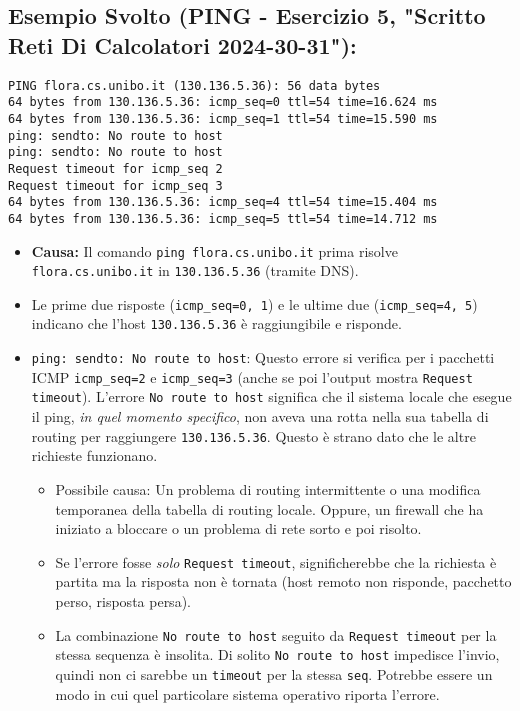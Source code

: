 \subsection{Esempio Svolto (PING - Esercizio 5, "Scritto Reti Di Calcolatori 2024-30-31"):}
\begin{verbatim}
PING flora.cs.unibo.it (130.136.5.36): 56 data bytes
64 bytes from 130.136.5.36: icmp_seq=0 ttl=54 time=16.624 ms
64 bytes from 130.136.5.36: icmp_seq=1 ttl=54 time=15.590 ms
ping: sendto: No route to host
ping: sendto: No route to host
Request timeout for icmp_seq 2
Request timeout for icmp_seq 3
64 bytes from 130.136.5.36: icmp_seq=4 ttl=54 time=15.404 ms
64 bytes from 130.136.5.36: icmp_seq=5 ttl=54 time=14.712 ms
\end{verbatim}
\begin{itemize}
    \item \textbf{Causa:} Il comando \texttt{ping flora.cs.unibo.it} prima risolve \texttt{flora.cs.unibo.it} in \texttt{130.136.5.36} (tramite DNS).
    \item Le prime due risposte (\texttt{icmp\_seq=0, 1}) e le ultime due (\texttt{icmp\_seq=4, 5}) indicano che l'host \texttt{130.136.5.36} è raggiungibile e risponde.
    \item \texttt{ping: sendto: No route to host}: Questo errore si verifica per i pacchetti ICMP \texttt{icmp\_seq=2} e \texttt{icmp\_seq=3} (anche se poi l'output mostra \texttt{Request timeout}). L'errore \texttt{No route to host} significa che il sistema locale che esegue il ping, \textit{in quel momento specifico}, non aveva una rotta nella sua tabella di routing per raggiungere \texttt{130.136.5.36}. Questo è strano dato che le altre richieste funzionano.
    \begin{itemize}
        \item Possibile causa: Un problema di routing intermittente o una modifica temporanea della tabella di routing locale. Oppure, un firewall che ha iniziato a bloccare o un problema di rete sorto e poi risolto.
        \item Se l'errore fosse \textit{solo} \texttt{Request timeout}, significherebbe che la richiesta è partita ma la risposta non è tornata (host remoto non risponde, pacchetto perso, risposta persa).
        \item La combinazione \texttt{No route to host} seguito da \texttt{Request timeout} per la stessa sequenza è insolita. Di solito \texttt{No route to host} impedisce l'invio, quindi non ci sarebbe un \texttt{timeout} per la stessa \texttt{seq}. Potrebbe essere un modo in cui quel particolare sistema operativo riporta l'errore.

\end{itemize}
\end{itemize}
